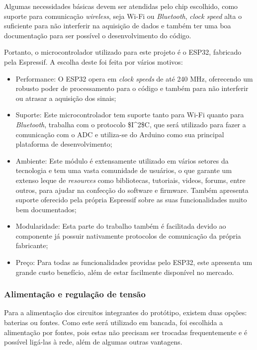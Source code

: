Algumas necessidades básicas devem ser atendidas pelo chip escolhido, como suporte para comunicação \textit{wireless}, seja Wi-Fi ou \textit{Bluetooth}, \textit{clock speed} alta o suficiente para não interferir na aquisição de dados e também ter uma boa documentação para ser possível o desenvolvimento do código.

Portanto, o microcontrolador utilizado para este projeto é o ESP32, fabricado pela Espressif. A escolha deste foi feita por vários motivos:

\begin{itemize}
    \item Performance: O ESP32 opera em \textit{clock speeds} de até 240 MHz, oferecendo um robusto poder de processamento para o código e também para não interferir ou atrasar a aquisição dos sinais;
    \item Suporte: Este microcontrolador tem suporte tanto para Wi-Fi quanto para \textit{Bluetooth}, trabalha com o protocolo \gls{$I^2$C}, que será utilizado para fazer a comunicação com o \gls{ADC} e utiliza-se do Arduino como sua principal plataforma de desenvolvimento;
    \item Ambiente: Este módulo é extensamente utilizado em vários setores da tecnologia e tem uma vasta comunidade de usuários, o que garante um extenso leque de \textit{resources} como bibliotecas, tutoriais, videos, forums, entre outros, para ajudar na confecção do software e firmware. Também apresenta suporte oferecido pela própria Espressif sobre as suas funcionalidades muito bem documentados;
    \item Modularidade: Esta parte do trabalho também é facilitada devido ao componente já possuir nativamente protocolos de comunicação da própria fabricante;
    \item Preço: Para todas as funcionalidades providas pelo ESP32, este apresenta um grande custo benefício, além de estar facilmente disponível no mercado.
\end{itemize}

\subsubsection{Alimentação e regulação de tensão}

Para a alimentação dos circuitos integrantes do protótipo, existem duas opções: baterias ou fontes. Como este será utilizado em bancada, foi escolhida a alimentação por fontes, pois estas não precisam ser trocadas frequentemente e é possível ligá-las à rede, além de algumas outras vantagens.

